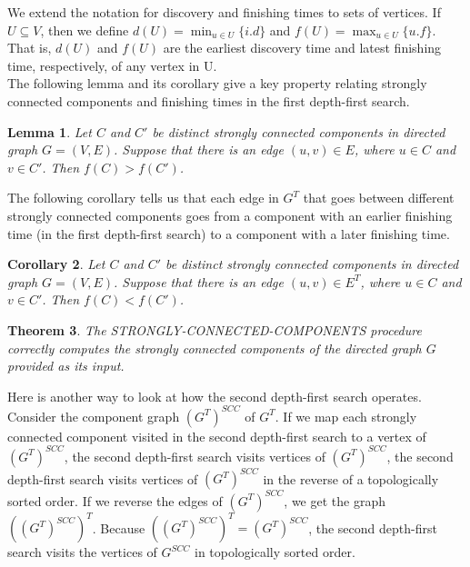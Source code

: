 \documentclass[12pt]{article}
\newtheorem{theorem}{Theorem}
\newtheorem{lemma}[theorem]{Lemma}
\newtheorem{corollary}[theorem]{Corollary}
\begin{document}
We extend the notation for discovery and finishing times to sets of vertices. If $U \subseteq V$, then we define $d(U) = \min_{u \in U} \{ i.d \}$ and $f(U) = \max_{u \in U} \{ u.f \}$. That is, $d(U)$ and $f(U)$ are the earliest discovery time and latest finishing time, respectively, of any vertex in U. \\

The following lemma and its corollary give a key property relating strongly connected components and finishing times in the first depth-first search.

\begin{lemma}
  Let $C$ and $C'$ be distinct strongly connected components in directed graph $G = (V,E)$. Suppose that there is an edge $(u,v) \in E$, where $u \in C$ and $v \in C'$. Then $f(C) > f(C')$. 
\end{lemma}

The following corollary tells us that each edge in $G^T$ that goes between different strongly connected components goes from a component with an earlier finishing time (in the first depth-first search) to a component with a later finishing time.

\begin{corollary}
  Let $C$ and $C'$ be distinct strongly connected components in directed graph $G = (V,E)$. Suppose that there is an edge $(u,v) \in E^T$, where $u \in C$ and $v \in C'$. Then $f(C) < f(C')$.
\end{corollary}

\begin{theorem}
  The STRONGLY-CONNECTED-COMPONENTS procedure correctly computes the strongly connected components of the directed graph $G$ provided as its input.
\end{theorem}

Here is another way to look at how the second depth-first search operates. Consider the component graph $(G^T)^{SCC}$ of $G^T$. If we map each strongly connected component visited in the second depth-first search to a vertex of $(G^T)^{SCC}$, the second depth-first search visits vertices of $(G^T)^{SCC}$, the second depth-first search visits vertices of $(G^T)^{SCC}$ in the reverse of a topologically sorted order. If we reverse the edges of $(G^T)^{SCC}$, we get the graph $((G^T)^{SCC})^T$. Because $((G^T)^{SCC})^T = (G^T)^{SCC}$, the second depth-first search visits the vertices of $G^{SCC}$ in topologically sorted order.
\end{document}

